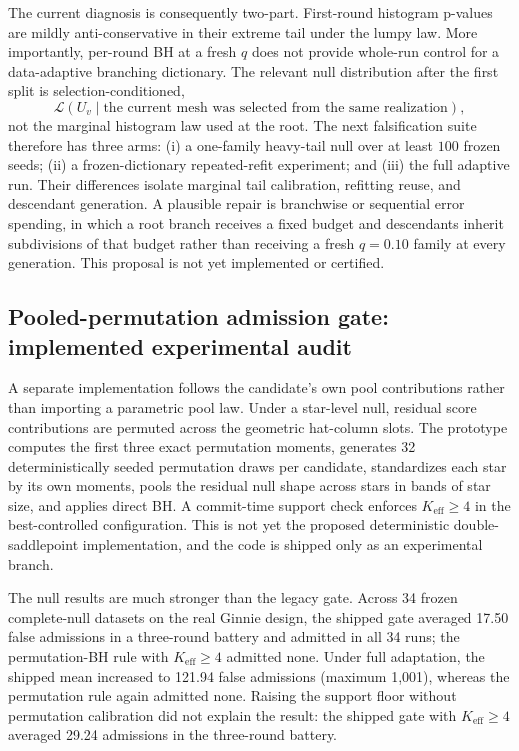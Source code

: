 \documentclass[11pt]{article}
\begin{document}
The current diagnosis is consequently two-part.  First-round histogram p-values are mildly
anti-conservative in their extreme tail under the lumpy law.  More importantly, per-round BH at a
fresh $q$ does not provide whole-run control for a data-adaptive branching dictionary.  The relevant
null distribution after the first split is selection-conditioned,
\[
 \mathcal L(U_v\mid\text{the current mesh was selected from the same realization}),
\]
not the marginal histogram law used at the root.  The next falsification suite therefore has three
arms: (i) a one-family heavy-tail null over at least $100$ frozen seeds; (ii) a frozen-dictionary
repeated-refit experiment; and (iii) the full adaptive run.  Their differences isolate marginal tail
calibration, refitting reuse, and descendant generation.  A plausible repair is branchwise or
sequential error spending, in which a root branch receives a fixed budget and descendants inherit
subdivisions of that budget rather than receiving a fresh $q=0.10$ family at every generation.  This
proposal is not yet implemented or certified.

\subsection*{Pooled-permutation admission gate: implemented experimental audit}

A separate implementation follows the candidate's own pool contributions
rather than importing a parametric pool law. Under a star-level null, residual
score contributions are permuted across the geometric hat-column slots. The
prototype computes the first three exact permutation moments, generates 32
deterministically seeded permutation draws per candidate, standardizes each
star by its own moments, pools the residual null shape across stars in bands of
star size, and applies direct BH. A commit-time support check enforces
$K_{\mathrm{eff}}\ge4$ in the best-controlled configuration. This is not yet
the proposed deterministic double-saddlepoint implementation, and the code is
shipped only as an experimental branch.

The null results are much stronger than the legacy gate. Across 34 frozen
complete-null datasets on the real Ginnie design, the shipped gate averaged
17.50 false admissions in a three-round battery and admitted in all 34 runs;
the permutation-BH rule with $K_{\mathrm{eff}}\ge4$ admitted none. Under full
adaptation, the shipped mean increased to 121.94 false admissions (maximum
1{,}001), whereas the permutation rule again admitted none. Raising the
support floor without permutation calibration did not explain the result: the
shipped gate with $K_{\mathrm{eff}}\ge4$ averaged 29.24 admissions in the
three-round battery.
\end{document}
